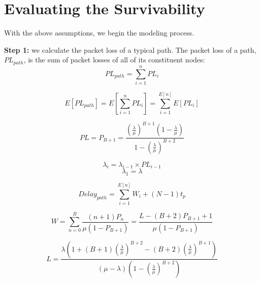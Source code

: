 \documentclass[conference]{IEEEtran}
\begin{document}
    \section{Evaluating the Survivability} \label{sec:eval}
    With the above assumptions, we begin the modeling process.

    \textbf{Step 1:} we calculate the packet loss of a typical path. The packet loss of a path, $PL_{path}$, is the sum of packet losses of all of its constituent nodes:
    \begin{equation}
        PL_{path}=\sum_{i=1}^nPL_i
    \end{equation}

    \begin{equation}
        E\left[PL_{path}\right]=E\left[\sum_{i=1}^nPL_i\right]=\sum_{i=1}^{E\left[n\right]}E\left[PL_i\right]
    \end{equation}

    \begin{equation}
        PL=P_{B+1}=\frac{{\left(\frac{\lambda}{\mu}\right)^{B+1}}{\left(1-\frac{\lambda}{\mu}\right)} }
        {{1-\left(\frac{\lambda}{\mu}\right)}^{B+2}}
    \end{equation}

    \begin{equation}
        \lambda_i=\lambda_{i-1} \times PL_{i-1}
    \end{equation}
    \begin{equation}
        \lambda_1=\lambda
    \end{equation}

    \begin{equation}
        Delay_{path}=\sum_{i=1}^{E\left[n\right]}W_i+\left(N-1\right)t_p
    \end{equation}

    \cite{b4}

    \begin{equation}
        W=\sum_{n=0}^B\frac{\left(n+1\right)P_n}
        {\mu\left(1-P_{B+1}\right)}=\frac{L-\left(B+2\right)P_{B+1}+1}{\mu\left(1-P_{B+1}\right)}
    \end{equation}

    \begin{equation}
        L=\frac{\lambda\left(1+\left(B+1\right)\left(\frac{\lambda}{\mu}\right)^{B+2}-\left(B+2\right)\left(\frac{\lambda}{\mu}\right)^{B+1}\right)}{\left(\mu-\lambda\right)\left(1-\left(\frac{\lambda}{\mu}\right)^{B+2}\right)}
    \end{equation}
\end{document}
